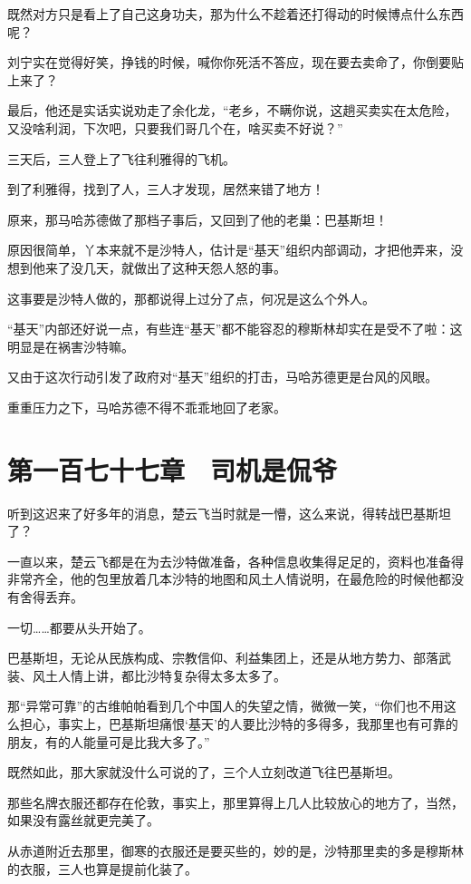 既然对方只是看上了自己这身功夫，那为什么不趁着还打得动的时候博点什么东西呢？

刘宁实在觉得好笑，挣钱的时候，喊你你死活不答应，现在要去卖命了，你倒要贴上来了？

最后，他还是实话实说劝走了余化龙，“老乡，不瞒你说，这趟买卖实在太危险，又没啥利润，下次吧，只要我们哥几个在，啥买卖不好说？”

三天后，三人登上了飞往利雅得的飞机。

到了利雅得，找到了人，三人才发现，居然来错了地方！

原来，那马哈苏德做了那档子事后，又回到了他的老巢：巴基斯坦！

原因很简单，丫本来就不是沙特人，估计是“基天”组织内部调动，才把他弄来，没想到他来了没几天，就做出了这种天怨人怒的事。

这事要是沙特人做的，那都说得上过分了点，何况是这么个外人。

“基天”内部还好说一点，有些连“基天”都不能容忍的穆斯林却实在是受不了啦：这明显是在祸害沙特嘛。

又由于这次行动引发了政府对“基天”组织的打击，马哈苏德更是台风的风眼。

重重压力之下，马哈苏德不得不乖乖地回了老家。

\section{第一百七十七章　司机是侃爷}

听到这迟来了好多年的消息，楚云飞当时就是一懵，这么来说，得转战巴基斯坦了？

一直以来，楚云飞都是在为去沙特做准备，各种信息收集得足足的，资料也准备得非常齐全，他的包里放着几本沙特的地图和风土人情说明，在最危险的时候他都没有舍得丢弃。

一切……都要从头开始了。

巴基斯坦，无论从民族构成、宗教信仰、利益集团上，还是从地方势力、部落武装、风土人情上讲，都比沙特复杂得太多太多了。

那“异常可靠”的古维帕帕看到几个中国人的失望之情，微微一笑，“你们也不用这么担心，事实上，巴基斯坦痛恨‘基天’的人要比沙特的多得多，我那里也有可靠的朋友，有的人能量可是比我大多了。”

既然如此，那大家就没什么可说的了，三个人立刻改道飞往巴基斯坦。

那些名牌衣服还都存在伦敦，事实上，那里算得上几人比较放心的地方了，当然，如果没有露丝就更完美了。

从赤道附近去那里，御寒的衣服还是要买些的，妙的是，沙特那里卖的多是穆斯林的衣服，三人也算是提前化装了。

